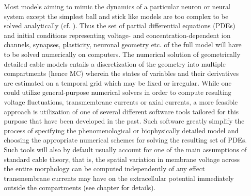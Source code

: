 Most models aiming to mimic the dynamics of a particular neuron or neural system except the simplest ball and stick like models are too complex to be solved analytically (cf. ).
Thus the set of partial differential equations (PDEs) and initial conditions representing voltage- and concentration-dependent ion channels, synapses, plasticity, neuronal geometry etc. of the full model will have to be solved numerically on computers.
The numerical solution of geometrically detailed cable models entails a discretization of the geometry into multiple compartments (hence MC) wherein the states of variables and their derivatives are estimated on a temporal grid which may be fixed or irregular.
While one could utilize general-purpose numerical solvers in order to compute resulting voltage fluctuations, transmembrane currents or axial currents,
a more feasible approach is utilization of one of several different software tools tailored for this purpose that have been developed in the past.
Such software greatly simplify the process of specifying the phenomenological or biophysically detailed model and choosing the appropriate numerical schemes for solving the resulting set of PDEs.
Such tools will also by default usually account for one of the main assumptions of standard cable theory, that is,
the spatial variation in membrane voltage across the entire morphology can be computed independently of any effect
transmembrane currents may have on the extracellular potential immediately outside the compartments (see chapter  for details).


